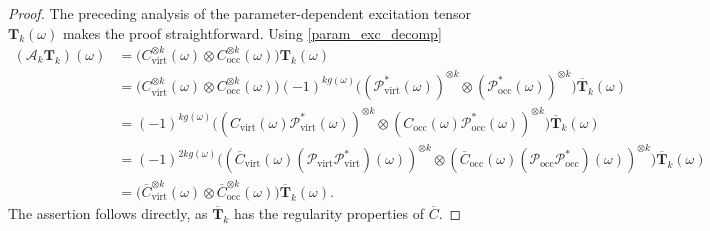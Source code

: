 \documentclass[reqno]{amsart}
\begin{document}
\begin{proof}
    The preceding analysis of the parameter-dependent excitation tensor $\mathbf{T}_k(\omega)$ makes the proof straightforward. Using \eqref{param_exc_decomp}
    \begin{align*}
        (\mathcal{A}_k\mathbf{T}_k)(\omega)&=\big(C_{\text{virt}}^{\otimes k}(\omega)\otimes C_{\text{occ}}^{\otimes k}(\omega)\big)\mathbf{T}_k(\omega)\\
        &=\big(C_{\text{virt}}^{\otimes k}(\omega)\otimes C_{\text{occ}}^{\otimes k}(\omega)\big)(-1)^{kg(\omega)} \big((\mathscr{P}_{\text{virt}}^*(\omega))^{\otimes k}\otimes(\mathscr{P}_{\text{occ}}^*(\omega))^{\otimes k}\big) \overline{\mathbf{T}}_k(\omega)\\
        &=(-1)^{kg(\omega)}\big((C_{\text{virt}}(\omega)\mathscr{P}_{\text{virt}}^*(\omega))^{\otimes k}\otimes (C_{\text{occ}}(\omega)\mathscr{P}_{\text{occ}}^*(\omega))^{\otimes k}\big) \overline{\mathbf{T}}_k(\omega)\\
        &=(-1)^{2kg(\omega)}\! \big((\overline{C}_{\text{virt}}(\omega)(\mathscr{P}_{\text{virt}}\mathscr{P}_{\text{virt}}^*)(\omega))^{\otimes k}\otimes(\overline{C}_{\text{occ}}(\omega)(\mathscr{P}_{\text{occ}}\mathscr{P}_{\text{occ}}^*)(\omega))^{\otimes k}\big) \overline{\mathbf{T}}_k(\omega)\\
        &=\big(\overline{C}^{\otimes k}_{\text{virt}}(\omega)\otimes \overline{C}^{\otimes k}_{\text{occ}}(\omega)\big) \overline{\mathbf{T}}_k(\omega).
    \end{align*}
    The assertion follows directly, as $\overline{\mathbf{T}}_k$ has the regularity properties of $\overline{C}$.
\end{proof}
\end{document}
